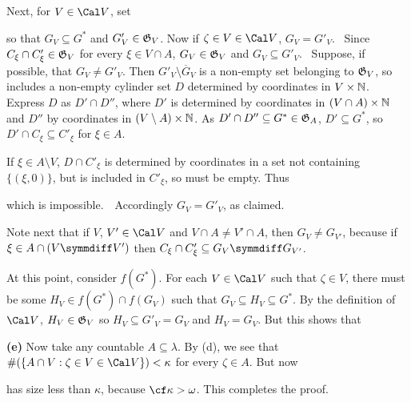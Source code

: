 {

\noindent Next, for $V\in\Cal V$, set


\noindent so that $G_V\subseteq G^*$ and $G'_V\in\frak G_V$.
Now if $\zeta\in V\in\Cal V$, $G_V=G'_V$.   \Prf\
Since $C_{\xi}\cap C'_{\xi}\in\frak G_V$ for every $\xi\in V\cap A$,
$G_V\in\frak G_V$ and $G_V\subseteq G'_V$.   \Quer\ Suppose, if
possible, that $G_V\ne G'_V$.   Then $G'_V\setminus\overline{G}_V$ is a
non-empty set belonging to $\frak G_V$, so includes a non-empty cylinder
set $D$ determined by coordinates in $V\times\Bbb N$.   Express $D$ as
$D'\cap D''$, where $D'$ is determined by coordinates in
$(V\cap A)\times\Bbb N$ and $D''$ by coordinates in
$(V\setminus A)\times\Bbb N$.   As
$D'\cap D''\subseteq G^*\in\frak G_A$, $D'\subseteq G^*$, so
$D'\cap C_{\xi}\subseteq C'_{\xi}$ for $\xi\in A$.

If $\xi\in A\setminus V$, $D\cap C'_{\xi}$ is determined by coordinates in
a set not containing $\{(\xi,0)\}$, but is included in $C'_{\xi}$, so must
be empty.   Thus


\noindent which is impossible.\ \BanG\  Accordingly
$G_V=G'_V$, as claimed.\ \Qed

Note next that if $V$, $V'\in\Cal V$ and $V\cap A\ne V'\cap A$, then
$G_V\ne G_{V'}$, because if $\xi\in A\cap(V\symmdiff V')$ then
$C_{\xi}\cap C'_{\xi}\subseteq G_V\symmdiff G_{V'}$.

At this point, consider $f(G^*)$.   For each $V\in\Cal V$ such that
$\zeta\in V$, there must be some $H_V\in f(G^*)\cap f(G_V)$ such that
$G_V\subseteq H_V\subseteq G^*$.   By the definition of $\Cal V$,
$H_V\in\frak G_V$ so $H_V\subseteq G'_V=G_V$ and $H_V=G_V$.   But this
shows that


\medskip

{\bf (e)} Now take any countable $A\subseteq\lambda$.   By (d), we see that
$\#(\{A\cap V:\zeta\in V\in\Cal V\})<\kappa$ for every $\zeta\in A$.
But now


\noindent has size less than $\kappa$, because $\cf\kappa>\omega$.
This completes the proof.
}%

